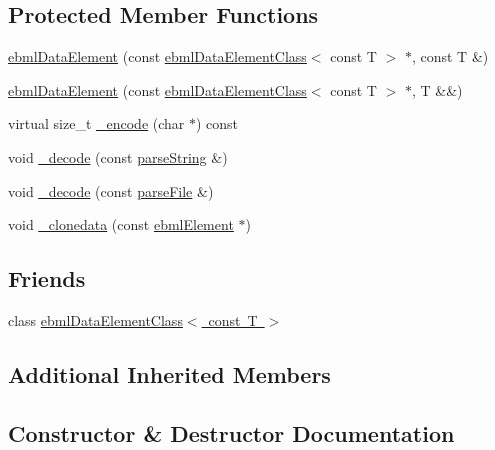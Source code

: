 \subsection*{Protected Member Functions}
\begin{DoxyCompactItemize}
\item 
\mbox{\hyperlink{classebml_1_1ebmlDataElement_3_01const_01T_01_4_abb559dd529796adda5e2ea9b8bedf876}{ebml\+Data\+Element}} (const \mbox{\hyperlink{classebml_1_1ebmlDataElementClass}{ebml\+Data\+Element\+Class}}$<$ const T $>$ $\ast$, const T \&)
\item 
\mbox{\hyperlink{classebml_1_1ebmlDataElement_3_01const_01T_01_4_aafdd5fd8f53e58c34891419df8fd196f}{ebml\+Data\+Element}} (const \mbox{\hyperlink{classebml_1_1ebmlDataElementClass}{ebml\+Data\+Element\+Class}}$<$ const T $>$ $\ast$, T \&\&)
\item 
virtual size\+\_\+t \mbox{\hyperlink{classebml_1_1ebmlDataElement_3_01const_01T_01_4_aac802a573eaeaa5b856d5e74deb9dd3a}{\+\_\+encode}} (char $\ast$) const
\item 
void \mbox{\hyperlink{classebml_1_1ebmlDataElement_3_01const_01T_01_4_a425794d8e3dd48e30dc1eb29e600de85}{\+\_\+decode}} (const \mbox{\hyperlink{classebml_1_1parseString}{parse\+String}} \&)
\item 
void \mbox{\hyperlink{classebml_1_1ebmlDataElement_3_01const_01T_01_4_ad5bc71b4d9aa91a02cf888a06e116482}{\+\_\+decode}} (const \mbox{\hyperlink{classebml_1_1parseFile}{parse\+File}} \&)
\item 
void \mbox{\hyperlink{classebml_1_1ebmlDataElement_3_01const_01T_01_4_a46a152b21a6fc49a331e61f29c486ebe}{\+\_\+clonedata}} (const \mbox{\hyperlink{classebml_1_1ebmlElement}{ebml\+Element}} $\ast$)
\end{DoxyCompactItemize}
\subsection*{Friends}
\begin{DoxyCompactItemize}
\item 
class \mbox{\hyperlink{classebml_1_1ebmlDataElement_3_01const_01T_01_4_aea1d7162edf00e39cf37b106860abbcd}{ebml\+Data\+Element\+Class$<$ const T $>$}}
\end{DoxyCompactItemize}
\subsection*{Additional Inherited Members}


\subsection{Constructor \& Destructor Documentation}
\mbox{\label{classebml_1_1ebmlDataElement_3_01const_01T_01_4_abb559dd529796adda5e2ea9b8bedf876}} 
